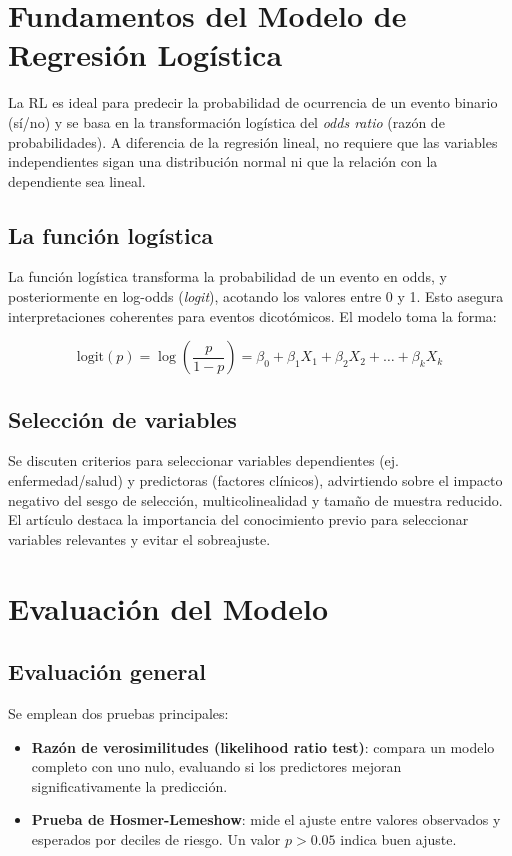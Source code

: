 \documentclass[12pt]{article}
\begin{document}
\section*{Fundamentos del Modelo de Regresi\'on Log\'istica}

La RL es ideal para predecir la probabilidad de ocurrencia de un evento binario (s\'i/no) y se basa en la transformaci\'on log\'istica del \textit{odds ratio} (raz\'on de probabilidades). A diferencia de la regresi\'on lineal, no requiere que las variables independientes sigan una distribuci\'on normal ni que la relaci\'on con la dependiente sea lineal.

\subsection*{La funci\'on log\'istica}
La funci\'on log\'istica transforma la probabilidad de un evento en odds, y posteriormente en log-odds (\textit{logit}), acotando los valores entre 0 y 1. Esto asegura interpretaciones coherentes para eventos dicot\'omicos. El modelo toma la forma:

\[
\text{logit}(p) = \log\left(\frac{p}{1-p}\right) = \beta_0 + \beta_1X_1 + \beta_2X_2 + \ldots + \beta_kX_k
\]

\subsection*{Selecci\'on de variables}
Se discuten criterios para seleccionar variables dependientes (ej. enfermedad/salud) y predictoras (factores cl\'inicos), advirtiendo sobre el impacto negativo del sesgo de selecci\'on, multicolinealidad y tama\~no de muestra reducido. El art\'iculo destaca la importancia del conocimiento previo para seleccionar variables relevantes y evitar el sobreajuste.

\section*{Evaluaci\'on del Modelo}

\subsection*{Evaluaci\'on general}
Se emplean dos pruebas principales:
\begin{itemize}
  \item \textbf{Raz\'on de verosimilitudes (likelihood ratio test)}: compara un modelo completo con uno nulo, evaluando si los predictores mejoran significativamente la predicci\'on.
  \item \textbf{Prueba de Hosmer-Lemeshow}: mide el ajuste entre valores observados y esperados por deciles de riesgo. Un valor $p > 0.05$ indica buen ajuste.
\end{itemize}
\end{document}

